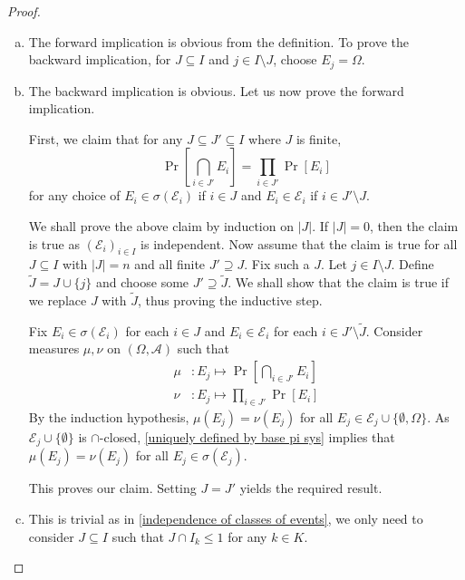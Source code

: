 \begin{proof}
    ~
    \begin{enumerate}[(a)]
        \item The forward implication is obvious from the definition. To prove the backward implication, for $J\subseteq I$ and $j\in I\setminus J$, choose $E_j=\Omega$.
        
        \item The backward implication is obvious. Let us now prove the forward implication.
        
        First, we claim that for any $J\subseteq J'\subseteq I$ where $J$ is finite, 
        $$\Pr\left[\bigcap_{i\in J'}E_i\right] = \prod_{i\in J'}\Pr[E_i]$$
        for any choice of $E_i\in\sigma(\mathcal{E}_i)$ if $i\in J$ and
        $E_i\in\mathcal{E}_i$ if $i\in J'\setminus J$.
        
        We shall prove the above claim by induction on $|J|$. If $|J|=0$, then the claim is true as $(\mathcal{E}_i)_{i\in I}$ is independent. Now assume that the claim is true for all $J\subseteq I$ with $|J|=n$ and all finite $J'\supseteq J$. Fix such a $J$. Let $j\in I\setminus J$. Define $\tilde J=J\cup\{j\}$ and choose some $J'\supseteq\tilde J$. We shall show that the claim is true if we replace $J$ with $\tilde J$, thus proving the inductive step.
    
        Fix $E_i\in\sigma(\mathcal{E}_i)$ for each $i\in J$ and $E_i\in\mathcal{E}_i$ for each $i\in J'\setminus\tilde J$. Consider measures $\mu,\nu$ on $(\Omega,\mathcal{A})$ such that
        \begin{align*}
            \mu &: E_j\mapsto \Pr\left[\bigcap_{i\in J'}E_i\right] \\
            \nu &: E_j\mapsto \prod_{i\in J'}\Pr[E_i]
        \end{align*}
        By the induction hypothesis, $\mu(E_j)=\nu(E_j)$ for all $E_j\in\mathcal{E}_j\cup\{\emptyset,\Omega\}$. As $\mathcal{E}_j\cup\{\emptyset\}$ is $\cap$-closed, \cref{uniquely defined by base pi sys} implies that $\mu(E_j)=\nu(E_j)$ for all $E_j\in\sigma(\mathcal{E}_j)$.
        
        This proves our claim. Setting $J=J'$ yields the required result.
    
        \item This is trivial as in \cref{independence of classes of events}, we only need to consider $J\subseteq I$ such that $J\cap I_k\leq 1$ for any $k\in K$.
    
    \end{enumerate}
\end{proof}

